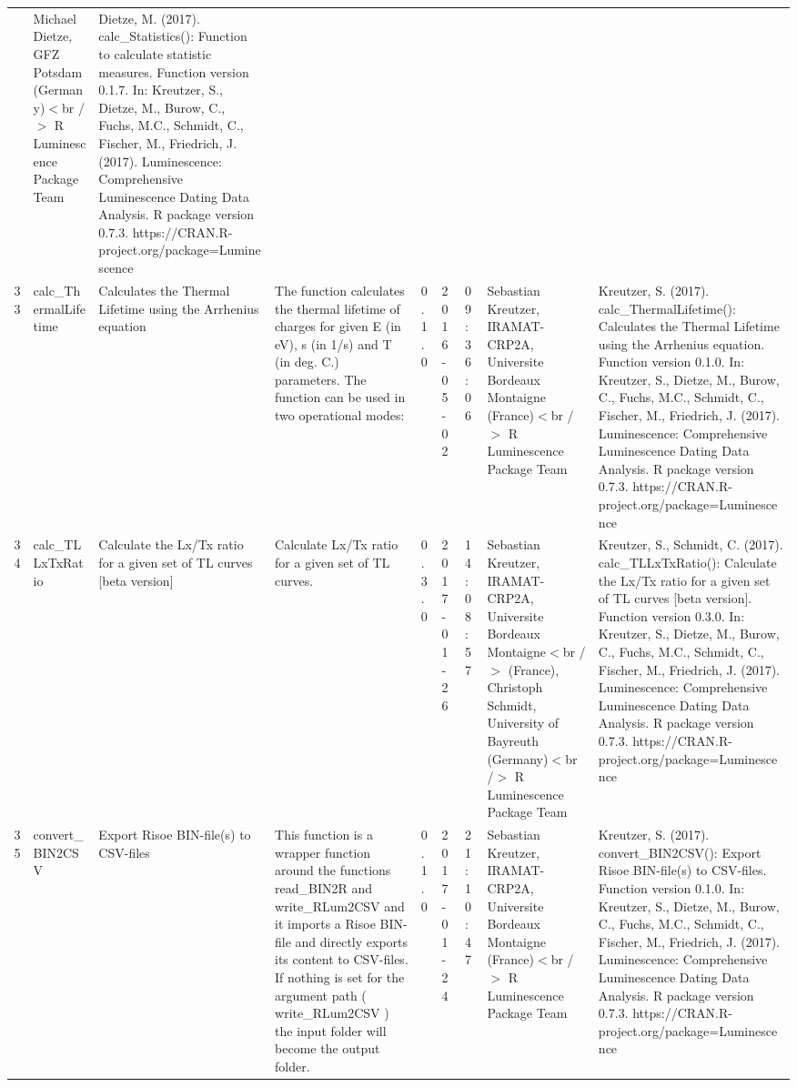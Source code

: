 \begin{table}[ht]
\begin{tabular}{rllllllll}
 & Michael Dietze, GFZ Potsdam (Germany)$<$br /$>$  R Luminescence Package Team & Dietze, M. (2017). calc\_Statistics(): Function to calculate statistic measures. Function version 0.1.7. In: Kreutzer, S., Dietze, M., Burow, C., Fuchs, M.C., Schmidt, C., Fischer, M., Friedrich, J. (2017). Luminescence: Comprehensive Luminescence Dating Data Analysis. R package version 0.7.3. https://CRAN.R-project.org/package=Luminescence
 \\ 
  33 & calc\_ThermalLifetime & Calculates the Thermal Lifetime using the Arrhenius equation & The function calculates the thermal lifetime of charges for given E (in eV), s (in 1/s) and T (in deg. C.) parameters. The function can be used in two operational modes: & 0.1.0 & 2016-05-02 & 09:36:06
 & Sebastian Kreutzer, IRAMAT-CRP2A, Universite Bordeaux Montaigne (France)$<$br /$>$  R Luminescence Package Team & Kreutzer, S. (2017). calc\_ThermalLifetime(): Calculates the Thermal Lifetime using the Arrhenius equation. Function version 0.1.0. In: Kreutzer, S., Dietze, M., Burow, C., Fuchs, M.C., Schmidt, C., Fischer, M., Friedrich, J. (2017). Luminescence: Comprehensive Luminescence Dating Data Analysis. R package version 0.7.3. https://CRAN.R-project.org/package=Luminescence
 \\ 
  34 & calc\_TLLxTxRatio & Calculate the Lx/Tx ratio for a given set of TL curves [beta version] & Calculate Lx/Tx ratio for a given set of TL curves. & 0.3.0 & 2017-01-26 & 14:08:57
 & Sebastian Kreutzer, IRAMAT-CRP2A, Universite Bordeaux Montaigne$<$br /$>$ (France), Christoph Schmidt, University of Bayreuth (Germany)$<$br /$>$  R Luminescence Package Team & Kreutzer, S., Schmidt, C. (2017). calc\_TLLxTxRatio(): Calculate the Lx/Tx ratio for a given set of TL curves [beta version]. Function version 0.3.0. In: Kreutzer, S., Dietze, M., Burow, C., Fuchs, M.C., Schmidt, C., Fischer, M., Friedrich, J. (2017). Luminescence: Comprehensive Luminescence Dating Data Analysis. R package version 0.7.3. https://CRAN.R-project.org/package=Luminescence
 \\ 
  35 & convert\_BIN2CSV & Export Risoe BIN-file(s) to CSV-files & This function is a wrapper function around the functions  read\_BIN2R  and write\_RLum2CSV  and it imports a Risoe BIN-file and directly exports its content to CSV-files. If nothing is set for the argument  path  ( write\_RLum2CSV ) the input folder will become the output folder. & 0.1.0 & 2017-01-24 & 21:10:47
 & Sebastian Kreutzer, IRAMAT-CRP2A, Universite Bordeaux Montaigne (France)$<$br /$>$  R Luminescence Package Team & Kreutzer, S. (2017). convert\_BIN2CSV(): Export Risoe BIN-file(s) to CSV-files. Function version 0.1.0. In: Kreutzer, S., Dietze, M., Burow, C., Fuchs, M.C., Schmidt, C., Fischer, M., Friedrich, J. (2017). Luminescence: Comprehensive Luminescence Dating Data Analysis. R package version 0.7.3. https://CRAN.R-project.org/package=Luminescence

\end{tabular}
\end{table}
